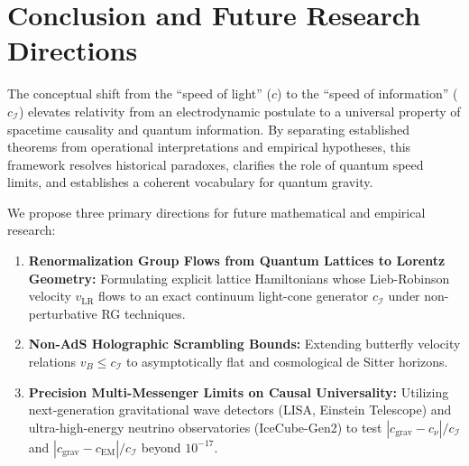 \documentclass[11pt,a4paper]{article}
\begin{document}
\section{Conclusion and Future Research Directions}

The conceptual shift from the ``speed of light'' ($c$) to the ``speed of information'' ($c_{\mathcal{I}}$) elevates relativity from an electrodynamic postulate to a universal property of spacetime causality and quantum information. By separating established theorems from operational interpretations and empirical hypotheses, this framework resolves historical paradoxes, clarifies the role of quantum speed limits, and establishes a coherent vocabulary for quantum gravity.

We propose three primary directions for future mathematical and empirical research:
\begin{enumerate}
    \item \textbf{Renormalization Group Flows from Quantum Lattices to Lorentz Geometry:} Formulating explicit lattice Hamiltonians whose Lieb-Robinson velocity $v_{\text{LR}}$ flows to an exact continuum light-cone generator $c_{\mathcal{I}}$ under non-perturbative RG techniques.
    \item \textbf{Non-AdS Holographic Scrambling Bounds:} Extending butterfly velocity relations $v_B \le c_{\mathcal{I}}$ to asymptotically flat and cosmological de Sitter horizons.
    \item \textbf{Precision Multi-Messenger Limits on Causal Universality:} Utilizing next-generation gravitational wave detectors (LISA, Einstein Telescope) and ultra-high-energy neutrino observatories (IceCube-Gen2) to test $|c_{\text{grav}} - c_{\nu}| / c_{\mathcal{I}}$ and $|c_{\text{grav}} - c_{\text{EM}}| / c_{\mathcal{I}}$ beyond $10^{-17}$.
\end{enumerate}
\end{document}
